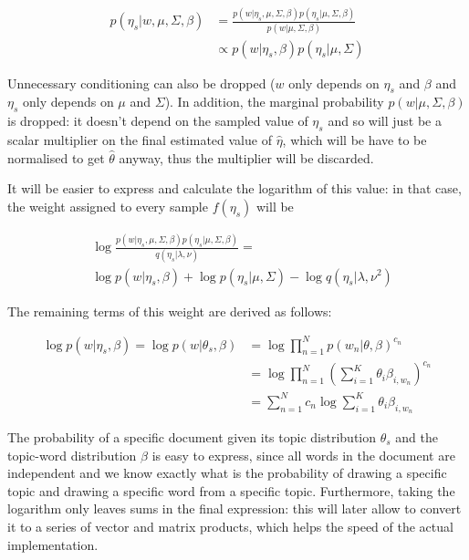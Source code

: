\documentclass[12pt,a4paper,twoside,openright]{report}
\begin{document}
\begin{align}
p(\eta_s | w, \mu, \Sigma, \beta) &= \frac{p(w | \eta_s, \mu, \Sigma, \beta)p(\eta_s | \mu, \Sigma, \beta)}{p(w | \mu, \Sigma, \beta)}\\
&\propto p(w | \eta_s, \beta) p(\eta_s | \mu, \Sigma)
\end{align}

Unnecessary conditioning can also be dropped ($w$ only depends on $\eta_s$ and $\beta$ and $\eta_s$ only depends on $\mu$ and $\Sigma$). In addition, the marginal probability $p(w | \mu, \Sigma, \beta)$ is dropped: it doesn't depend on the sampled value of $\eta_s$ and so will just be a scalar multiplier on the final estimated value of $\hat\eta$, which will be have to be normalised to get $\hat\theta$ anyway, thus the multiplier will be discarded.

It will be easier to express and calculate the logarithm of this value: in that case, the weight assigned to every sample $f(\eta_s)$ will be

\begin{align}
&\log \frac{p(w | \eta_s, \mu, \Sigma, \beta)p(\eta_s | \mu, \Sigma, \beta)}{q(\eta_s | \lambda, \nu)} = \\
&\log p(w | \eta_s, \beta) + \log p(\eta_s | \mu, \Sigma) - \log q(\eta_s | \lambda, \nu^2)
\end{align}

The remaining terms of this weight are derived as follows:

\begin{align}
\log p(w | \eta_s, \beta) = \log p(w | \theta_s, \beta) &= \log \prod\limits_{n=1}^N p(w_n | \theta, \beta)^{c_n}\\
&= \log \prod\limits_{n=1}^N \left(\sum\limits_{i=1}^K \theta_i \beta_{i, w_n}\right)^{c_n}\\
&= \sum\limits_{n=1}^N c_n \log \sum\limits_{i=1}^K \theta_i \beta_{i, w_n}
\end{align}

The probability of a specific document given its topic distribution $\theta_s$ and the topic-word distribution $\beta$ is easy to express, since all words in the document are independent and we know exactly what is the probability of drawing a specific topic and drawing a specific word from a specific topic. Furthermore, taking the logarithm only leaves sums in the final expression: this will later allow to convert it to a series of vector and matrix products, which helps the speed of the actual implementation.
\end{document}
